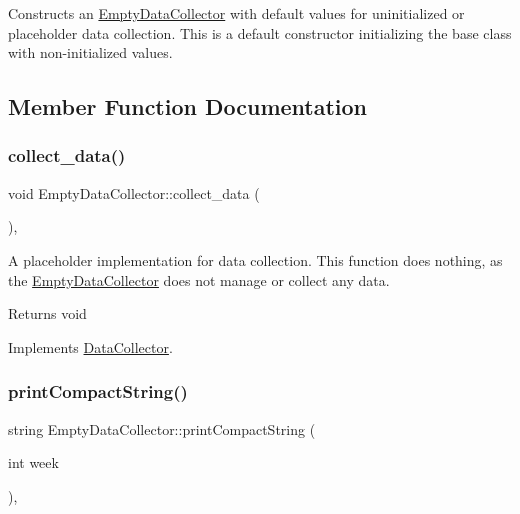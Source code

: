 Constructs an \mbox{\hyperlink{classEmptyDataCollector}{Empty\+Data\+Collector}} with default values for uninitialized or placeholder data collection. This is a default constructor initializing the base class with non-\/initialized values. 



\subsection{Member Function Documentation}
\mbox{\label{classEmptyDataCollector_a2993f4e00acd2eff18bed2e39108e89f}} 
\subsubsection{\texorpdfstring{collect\+\_\+data()}{collect\_data()}}
{\footnotesize\ttfamily void Empty\+Data\+Collector\+::collect\+\_\+data (\begin{DoxyParamCaption}{ }\end{DoxyParamCaption})\hspace{0.3cm}{\ttfamily [override]}, {\ttfamily [virtual]}}



A placeholder implementation for data collection. This function does nothing, as the \mbox{\hyperlink{classEmptyDataCollector}{Empty\+Data\+Collector}} does not manage or collect any data. 

\begin{DoxyReturn}{Returns}
void 
\end{DoxyReturn}


Implements \mbox{\hyperlink{classDataCollector_a01486bf58acbe37b203f97b3b9a79c40}{Data\+Collector}}.

\mbox{\label{classEmptyDataCollector_ad4a4ebbf610b3939e34442795a392dd5}} 
\subsubsection{\texorpdfstring{print\+Compact\+String()}{printCompactString()}}
{\footnotesize\ttfamily string Empty\+Data\+Collector\+::print\+Compact\+String (\begin{DoxyParamCaption}\item[{int}]{week }\end{DoxyParamCaption})\hspace{0.3cm}{\ttfamily [override]}, {\ttfamily [virtual]}}




